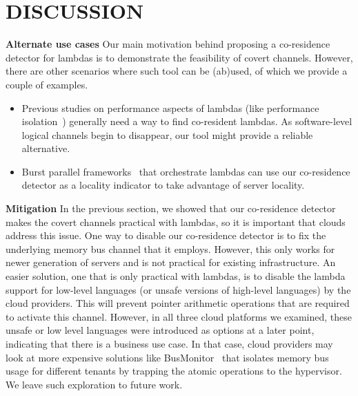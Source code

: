 \section{DISCUSSION}
\label{sec:discussion}
\textbf{Alternate use cases}
Our main motivation behind proposing a co-residence detector for lambdas is
to demonstrate the feasibility of covert channels. However, there are other
scenarios where such tool can be (ab)used, of which we provide a couple of examples. 
\begin{itemize}
    \item Previous studies on performance aspects of lambdas (like performance 
    isolation~\cite{wangusenix2018}) generally need a way to find co-resident
    lambdas. As software-level logical channels begin to disappear, our tool 
    might provide a reliable alternative.
    \item Burst parallel frameworks~\cite{234886} that orchestrate lambdas can
    use our co-residence detector as a locality indicator to take advantage of
    server locality.
\end{itemize}

\textbf{Mitigation}
In the previous section, we showed that our co-residence detector makes the covert
channels practical with lambdas, so it is important that clouds address this
issue. One way to disable our co-residence detector is to fix the underlying
memory bus channel that it employs. However, this only works for newer
generation of servers and is not practical for existing infrastructure. An
easier solution, one that is only practical with lambdas, is to disable the
lambda support for low-level languages (or unsafe versions of high-level
languages) by the cloud providers. This will prevent pointer arithmetic operations that are
required to activate this channel. However, in all three cloud platforms we examined, 
these unsafe or low level languages were introduced as options at a later point, 
indicating that there is a business use case. In that case, cloud providers may look at
more expensive solutions like BusMonitor~\cite{MemoryBusMitigation} that isolates
memory bus usage for different tenants by trapping the atomic operations to the 
hypervisor. We leave such exploration to future work.
